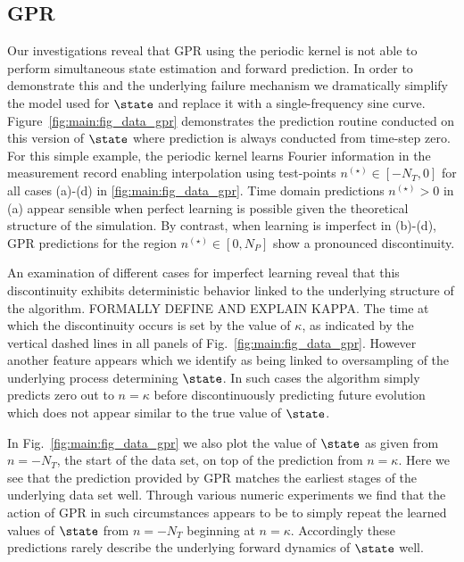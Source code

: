 {\subsection{GPR} 
Our investigations reveal that GPR using the periodic kernel is not able to perform simultaneous state estimation and forward prediction.  In order to demonstrate this and the underlying failure mechanism we dramatically simplify the model used for $\state$ and replace it with a single-frequency sine curve.  Figure~\ref{fig:main:fig_data_gpr} demonstrates the prediction routine conducted on this version of $\state$ where prediction is always conducted from time-step zero.   For this simple example, the periodic kernel learns Fourier information in the measurement record enabling interpolation using test-points $n^{(\star)} \in [-N_T, 0]$ for all cases (a)-(d) in \cref{fig:main:fig_data_gpr}. Time domain predictions $n^{(\star)} >0$  in (a) appear sensible when perfect learning is possible given the theoretical structure of the simulation. By contrast, when learning is imperfect in (b)-(d), GPR predictions for the region  $n^{(\star)} \in [0, N_P]$ show a pronounced discontinuity.

An examination of different cases for imperfect learning reveal that this discontinuity exhibits deterministic behavior linked to the underlying structure of the algorithm.  FORMALLY DEFINE AND EXPLAIN KAPPA.  The time at which the discontinuity occurs is set by the value of $\kappa$, as indicated by the vertical dashed lines in all panels of Fig.~\ref{fig:main:fig_data_gpr}.  However another feature appears which we identify as being linked to oversampling of the underlying process determining $\state$.  In such cases the algorithm simply predicts zero out to $n=\kappa$ before discontinuously predicting future evolution which does not appear similar to the true value of $\state$.

In Fig.~\ref{fig:main:fig_data_gpr} we also plot the value of $\state$ as given from $n=-N_{T}$, the start of the data set, on top of the prediction from $n=\kappa$.  Here we see that the prediction provided by GPR matches the earliest stages of the underlying data set well.  Through various numeric experiments we find that the action of GPR in such circumstances appears to be to simply repeat the learned values of $\state$ from $n=-N_{T}$ beginning at $n=\kappa$.  Accordingly these predictions rarely describe the underlying forward dynamics of $\state$ well.




}
